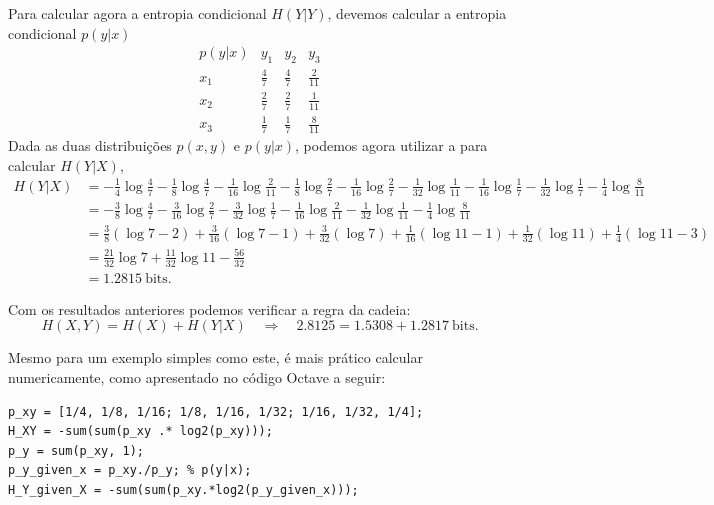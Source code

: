 \begin{example}
Para calcular agora a entropia condicional $H(Y|Y)$, devemos calcular a entropia condicional $p(y|x)$
\begin{equation*}
\begin{array}{c|ccc}
p(y|x) & y_1 & y_2 & y_3 \\
\hline
x_1 & \frac{4}{7} & \frac{4}{7} & \frac{2}{11} \\
x_2 & \frac{2}{7} & \frac{2}{7} & \frac{1}{11} \\
x_3 & \frac{1}{7} & \frac{1}{7} & \frac{8}{11} 
\end{array}
\end{equation*}
Dada as duas distribuições $p(x,y)$ e $p(y|x)$, podemos agora utilizar a
 para calcular $H(Y|X)$, 
\begin{align*}
    H(Y|X) &= - \frac{1}{4}\log\frac{4}{7} - \frac{1}{8}\log\frac{4}{7} - \frac{1}{16}\log\frac{2}{11} 
              - \frac{1}{8}\log\frac{2}{7} - \frac{1}{16}\log\frac{2}{7} - \frac{1}{32}\log\frac{1}{11} 
	      - \frac{1}{16}\log\frac{1}{7} - \frac{1}{32}\log\frac{1}{7} - \frac{1}{4}\log\frac{8}{11} \\
	   &= - \frac{3}{8}\log\frac{4}{7} - \frac{3}{16}\log\frac{2}{7} - \frac{3}{32}\log\frac{1}{7} 
	      - \frac{1}{16}\log\frac{2}{11} - \frac{1}{32}\log\frac{1}{11} - \frac{1}{4}\log\frac{8}{11}\\
	   &= \frac{3}{8}(\log 7 - 2) + \frac{3}{16}(\log 7 - 1) + \frac{3}{32}(\log 7) 
	      + \frac{1}{16}(\log 11 - 1) + \frac{1}{32}(\log 11) + \frac{1}{4}(\log 11 - 3)  \\
	   &= \frac{21}{32}\log 7 + \frac{11}{32}\log 11  - \frac{56}{32}\\
	   &= 1.2815  \ \text{bits}.
\end{align*}

Com os resultados anteriores podemos verificar a regra da cadeia:
\begin{equation*}
H(X,Y) = H(X) + H(Y|X) \quad \Rightarrow \quad 2.8125 = 1.5308 + 1.2817 \ \text{bits}.
\end{equation*}

Mesmo para um exemplo simples como este, é mais prático calcular
numericamente, como apresentado no código Octave a seguir:
\begin{verbatim}
p_xy = [1/4, 1/8, 1/16; 1/8, 1/16, 1/32; 1/16, 1/32, 1/4];
H_XY = -sum(sum(p_xy .* log2(p_xy)));
p_y = sum(p_xy, 1);
p_y_given_x = p_xy./p_y; % p(y|x);
H_Y_given_X = -sum(sum(p_xy.*log2(p_y_given_x)));
\end{verbatim}
\end{example}


